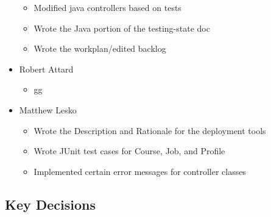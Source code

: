 \documentclass[12pt]{article}
\begin{document}
\begin{itemize}
\begin{itemize}
            \item Modified java controllers based on tests
            \item Wrote the Java portion of the testing-state doc
            \item Wrote the workplan/edited backlog
        \end{itemize}
     \item Robert Attard
     \begin{itemize}
         \item gg
     \end{itemize}
     \item Matthew Lesko
     \begin{itemize}
        \item Wrote the Description and Rationale for the deployment tools 
        \item Wrote JUnit test cases for Course, Job, and Profile
        \item Implemented certain error messages for controller classes
     \end{itemize}
 \end{itemize}

 \subsection{Key Decisions}

\end{document}
